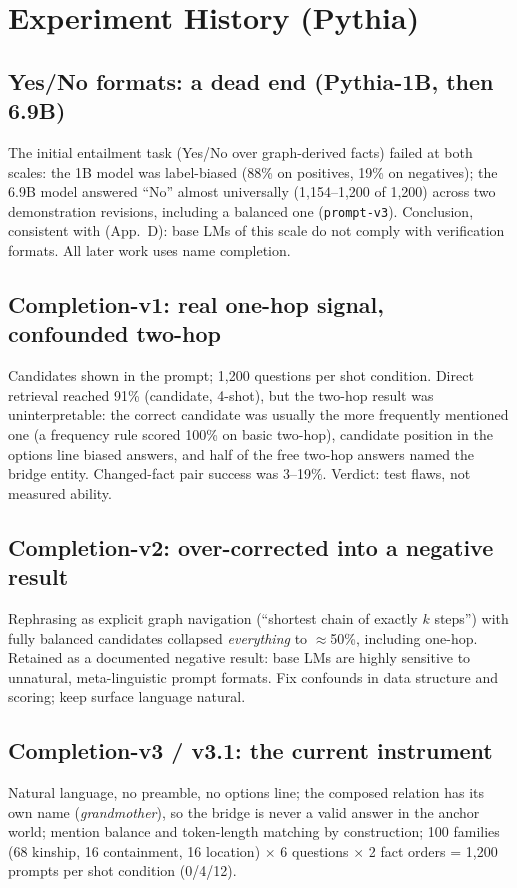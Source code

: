 \documentclass[11pt,a4paper]{article}
\begin{document}
\section{Experiment History (Pythia)}
\subsection{Yes/No formats: a dead end (Pythia-1B, then 6.9B)}
The initial entailment task (Yes/No over graph-derived facts) failed at both scales: the 1B model was label-biased (88\% on positives, 19\% on negatives); the 6.9B model answered ``No'' almost universally (1{,}154--1{,}200 of 1{,}200) across two demonstration revisions, including a balanced one (\texttt{prompt-v3}). Conclusion, consistent with \cite{ren} (App.~D): base LMs of this scale do not comply with verification formats. All later work uses name completion.

\subsection{Completion-v1: real one-hop signal, confounded two-hop}
Candidates shown in the prompt; 1{,}200 questions per shot condition. Direct retrieval reached 91\% (candidate, 4-shot), but the two-hop result was uninterpretable: the correct candidate was usually the more frequently mentioned one (a frequency rule scored 100\% on basic two-hop), candidate position in the options line biased answers, and half of the free two-hop answers named the bridge entity. Changed-fact pair success was 3--19\%. Verdict: test flaws, not measured ability.

\subsection{Completion-v2: over-corrected into a negative result}
Rephrasing as explicit graph navigation (``shortest chain of exactly $k$ steps'') with fully balanced candidates collapsed \emph{everything} to $\approx$50\%, including one-hop. Retained as a documented negative result: base LMs are highly sensitive to unnatural, meta-linguistic prompt formats. Fix confounds in data structure and scoring; keep surface language natural.

\subsection{Completion-v3 / v3.1: the current instrument}
Natural language, no preamble, no options line; the composed relation has its own name (\emph{grandmother}), so the bridge is never a valid answer in the anchor world; mention balance and token-length matching by construction; 100 families (68 kinship, 16 containment, 16 location) $\times$ 6 questions $\times$ 2 fact orders = 1{,}200 prompts per shot condition (0/4/12).
\end{document}
